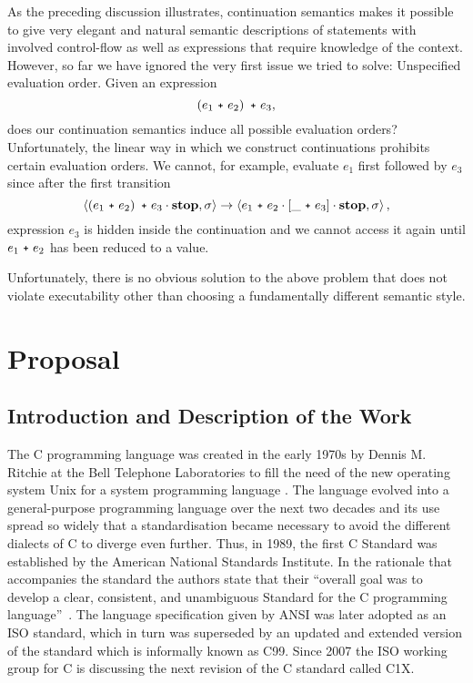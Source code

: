 \documentclass[a4paper,12pt]{scrbook}
\theoremstyle{plain}
\theoremstyle{definition}
\newcommand{\cc}[1]{{\text{\footnotesize\ttfamily{#1}}}}
\newcommand{\comp}[0]{\cdot}
\begin{document}
As the preceding discussion illustrates, continuation semantics makes it possible
to give very elegant and natural semantic descriptions of statements with
involved control-flow as well as expressions that require knowledge of the
context. However, so far we have ignored the very first issue we tried to solve:
Unspecified evaluation order. Given an expression
\begin{equation*}
\left( e_1 ~\cc{+}~ e_2 \right) ~\cc{+}~ e_3 ,
\end{equation*}
does our continuation semantics induce all possible evaluation orders?
Unfortunately, the linear way in which we construct continuations prohibits
certain evaluation orders. We cannot, for example, evaluate $e_1$ first followed
by $e_3$ since after the first transition
\begin{equation*}
\left< \left( e_1 ~\cc{+}~ e_2 \right) ~\cc{+}~ e_3 \comp \textbf{stop},
       \sigma \right>
\rightarrow
\left< e_1 ~\cc{+}~ e_2 \comp \left[ \_ ~\cc{+}~ e_3 \right] \comp \textbf{stop},
       \sigma \right>,
\end{equation*}
expression $e_3$ is hidden inside the continuation and we cannot access it again
until $e_1 ~\cc{+}~ e_2$ has been reduced to a value.

Unfortunately, there is no obvious solution to the above problem that does not
violate executability other than choosing a fundamentally different semantic
style.

\chapter{Proposal}\label{proposal}

\section*{Introduction and Description of the Work}
The C programming language was created in the early 1970s by Dennis M. Ritchie at the Bell Telephone Laboratories to fill the need of the new operating system Unix for a system programming language \cite{developmentOfC}. The language evolved into a general-purpose programming language over the next two decades and its use spread so widely that a standardisation became necessary to avoid the different dialects of C to diverge even further. Thus, in 1989, the first C Standard was established by the American National Standards Institute. In the rationale that accompanies the standard the authors state that their \textquotedblleft overall goal was to develop a clear, consistent, and unambiguous Standard for the C programming language\textquotedblright~\cite{ansiC}. The language specification given by ANSI was later adopted as an ISO standard, which in turn was superseded by an updated and extended version of the standard which is informally known as C99. Since 2007 the ISO working group for C is discussing the next revision of the C standard called C1X.
\end{document}
